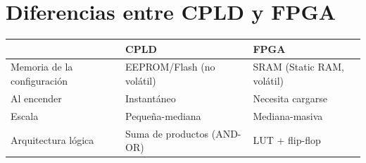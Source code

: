 \section{Diferencias entre CPLD y FPGA}
\begin{center}
    \begin{tabular}{|l|l|l|}
        \hline
                                                            & \cellcolor[HTML]{DAE8FC}CPLD & \cellcolor[HTML]{FFCCC9}FPGA \\ \hline
        \cellcolor[HTML]{EFEFEF}Memoria de la configuración & EEPROM/Flash (no volátil)    & SRAM (Static RAM, volátil)   \\ \hline
        \cellcolor[HTML]{EFEFEF}Al encender                 & Instantáneo                  & Necesita cargarse            \\ \hline
        \cellcolor[HTML]{EFEFEF}Escala                      & Pequeña-mediana              & Mediana-masiva               \\ \hline
        \cellcolor[HTML]{EFEFEF}Arquitectura lógica         & Suma de productos (AND-OR)   & LUT + flip-flop              \\ \hline
    \end{tabular}
\end{center}
